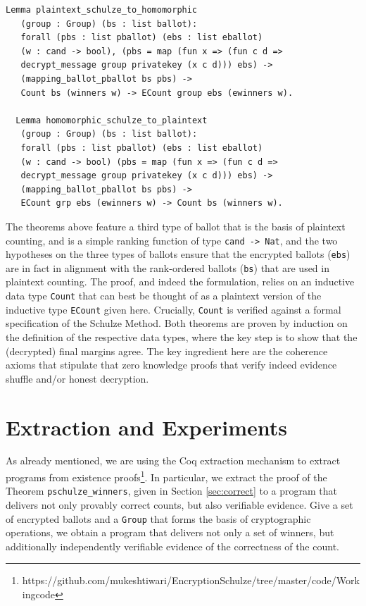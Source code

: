 \documentclass{llncs}
\begin{document}
\begin{lstlisting}[frame=single,basicstyle=\ttfamily\footnotesize]
  Lemma plaintext_schulze_to_homomorphic 
   (group : Group) (bs : list ballot): 
   forall (pbs : list pballot) (ebs : list eballot) 
   (w : cand -> bool), (pbs = map (fun x => (fun c d => 
   decrypt_message group privatekey (x c d))) ebs) ->
   (mapping_ballot_pballot bs pbs) -> 
   Count bs (winners w) -> ECount group ebs (ewinners w).
      
  Lemma homomorphic_schulze_to_plaintext 
   (group : Group) (bs : list ballot):
   forall (pbs : list pballot) (ebs : list eballot) 
   (w : cand -> bool) (pbs = map (fun x => (fun c d => 
   decrypt_message group privatekey (x c d))) ebs) ->
   (mapping_ballot_pballot bs pbs) ->
   ECount grp ebs (ewinners w) -> Count bs (winners w).
\end{lstlisting}

\noindent
The theorems above feature a third type of ballot that is the basis
of plaintext counting, and is a simple ranking function of type
\texttt{cand -> Nat}, and the two hypotheses on the three types of
ballots ensure that the encrypted ballots (\texttt{ebs}) are in fact
in alignment with the rank-ordered ballots (\texttt{bs}) that are
used in plaintext counting. 
The proof, and indeed the formulation, relies on an inductive data
type \texttt{Count} that can best be thought of as a plaintext
version of the inductive type  \texttt{ECount} given here.
Crucially, \texttt{Count} is verified against a formal specification
of the Schulze Method. Both theorems are proven by induction on the
definition of the respective data types, where the key step is to
show that the (decrypted) final margins agree. The key ingredient
here are the coherence axioms that stipulate that zero knowledge
proofs that verify indeed evidence shuffle and/or honest decryption.



\section{Extraction and Experiments} \label{sec:extract}

As already mentioned, we are using  the Coq extraction
mechanism\cite{Letouzey:2003:NEC}  to extract programs from
existence 
proofs\footnote{https://github.com/mukeshtiwari/EncryptionSchulze/tree/master/code/Workingcode}. In particular, we extract the proof of the Theorem
\texttt{pschulze\_winners}, given in Section \ref{sec:correct} to a
program that delivers not only provably correct counts, but also
verifiable evidence.  Give a set of encrypted ballots and a \texttt{Group}
that forms the basis of cryptographic operations, we obtain a program that
delivers not only a set of winners, but additionally independently  verifiable
evidence of the correctness of the count. 
\end{document}
